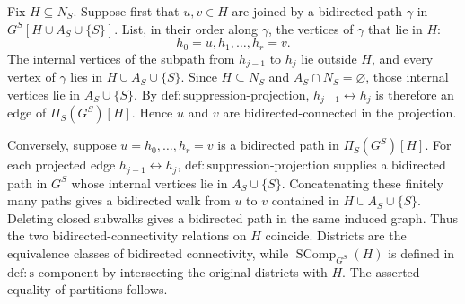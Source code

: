 Fix \(H\subseteq N_S\).  Suppose first that \(u,v\in H\) are joined by a bidirected path \(\gamma\) in \(G^S[H\cup A_S\cup\{S\}]\).  List, in their order along \(\gamma\), the vertices of \(\gamma\) that lie in \(H\):
\[
  h_0=u,h_1,\ldots,h_r=v.
\]
The internal vertices of the subpath from \(h_{j-1}\) to \(h_j\) lie outside \(H\), and every vertex of \(\gamma\) lies in \(H\cup A_S\cup\{S\}\).  Since \(H\subseteq N_S\) and \(A_S\cap N_S=\varnothing\), those internal vertices lie in \(A_S\cup\{S\}\).  By \(\mathrm{def:suppression\text{-}projection}\), \(h_{j-1}\leftrightarrow h_j\) is therefore an edge of \(\Pi_S(G^S)[H]\).  Hence \(u\) and \(v\) are bidirected-connected in the projection.

Conversely, suppose \(u=h_0,\ldots,h_r=v\) is a bidirected path in \(\Pi_S(G^S)[H]\).  For each projected edge \(h_{j-1}\leftrightarrow h_j\), \(\mathrm{def:suppression\text{-}projection}\) supplies a bidirected path in \(G^S\) whose internal vertices lie in \(A_S\cup\{S\}\).  Concatenating these finitely many paths gives a bidirected walk from \(u\) to \(v\) contained in \(H\cup A_S\cup\{S\}\).  Deleting closed subwalks gives a bidirected path in the same induced graph.  Thus the two bidirected-connectivity relations on \(H\) coincide.  Districts are the equivalence classes of bidirected connectivity, while \(\operatorname{SComp}_{G^S}(H)\) is defined in \(\mathrm{def:s\text{-}component}\) by intersecting the original districts with \(H\).  The asserted equality of partitions follows.